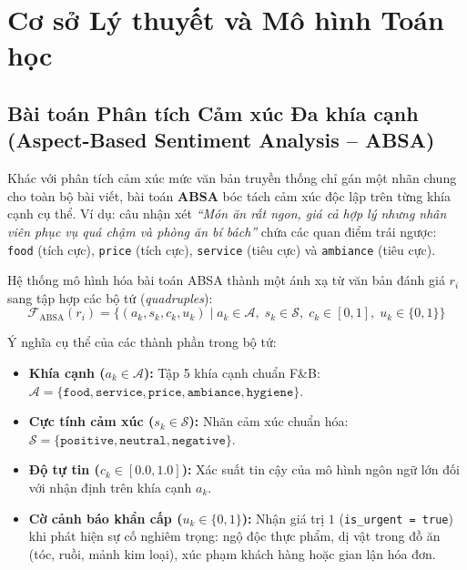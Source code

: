 \documentclass[12pt, a4paper]{article}
\begin{document}
\clearpage
\section{Cơ sở Lý thuyết và Mô hình Toán học}

\subsection{Bài toán Phân tích Cảm xúc Đa khía cạnh (Aspect-Based Sentiment Analysis -- ABSA)}
Khác với phân tích cảm xúc mức văn bản truyền thống chỉ gán một nhãn chung cho toàn bộ bài viết, bài toán \textbf{ABSA} \cite{pontiki2014semeval, zhang2022survey} bóc tách cảm xúc độc lập trên từng khía cạnh cụ thể. Ví dụ: câu nhận xét \textit{``Món ăn rất ngon, giá cả hợp lý nhưng nhân viên phục vụ quá chậm và phòng ăn bí bách''} chứa các quan điểm trái ngược: \texttt{food} (tích cực), \texttt{price} (tích cực), \texttt{service} (tiêu cực) và \texttt{ambiance} (tiêu cực).

Hệ thống mô hình hóa bài toán ABSA thành một ánh xạ từ văn bản đánh giá $r_i$ sang tập hợp các bộ tứ (\textit{quadruples}):
\begin{equation}
    \mathcal{F}_{\text{ABSA}}(r_i) = \Big\{ \left( a_k, s_k, c_k, u_k \right) \;\Big|\; a_k \in \mathcal{A},\; s_k \in \mathcal{S},\; c_k \in [0, 1],\; u_k \in \{0, 1\} \Big\}
\end{equation}

Ý nghĩa cụ thể của các thành phần trong bộ tứ:
\begin{itemize}[leftmargin=1.0cm, itemsep=2pt]
    \item \textbf{Khía cạnh ($a_k \in \mathcal{A}$):} Tập 5 khía cạnh chuẩn F\&B: $\mathcal{A} = \{\texttt{food}, \texttt{service}, \texttt{price}, \texttt{ambiance}, \texttt{hygiene}\}$.
    \item \textbf{Cực tính cảm xúc ($s_k \in \mathcal{S}$):} Nhãn cảm xúc chuẩn hóa: $\mathcal{S} = \{\texttt{positive}, \texttt{neutral}, \texttt{negative}\}$.
    \item \textbf{Độ tự tin ($c_k \in [0.0, 1.0]$):} Xác suất tin cậy của mô hình ngôn ngữ lớn đối với nhận định trên khía cạnh $a_k$.
    \item \textbf{Cờ cảnh báo khẩn cấp ($u_k \in \{0, 1\}$):} Nhận giá trị $1$ (\texttt{is\_urgent = true}) khi phát hiện sự cố nghiêm trọng: ngộ độc thực phẩm, dị vật trong đồ ăn (tóc, ruồi, mảnh kim loại), xúc phạm khách hàng hoặc gian lận hóa đơn.
\end{itemize}
\end{document}
